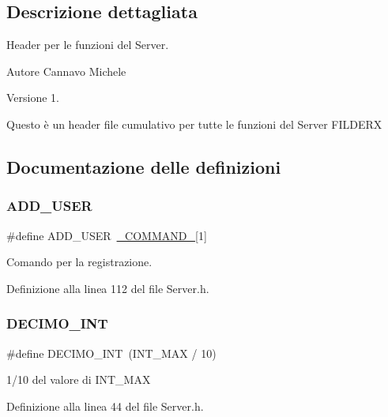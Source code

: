 \subsection{Descrizione dettagliata}
Header per le funzioni del Server. 



 \begin{DoxyAuthor}{Autore}
Cannavo Michele
\end{DoxyAuthor}
\begin{DoxyVersion}{Versione}
1.
\end{DoxyVersion}
Questo è un header file cumulativo per tutte le funzioni del Server F\+I\+L\+D\+E\+RX 

\subsection{Documentazione delle definizioni}
\mbox{\label{a00050_a8b1058dc115af8d4db0d84f2c43a61ca}} 
\subsubsection{\texorpdfstring{ADD\_USER}{ADD\_USER}}
{\footnotesize\ttfamily \#define A\+D\+D\+\_\+\+U\+S\+ER~\mbox{\hyperlink{a00050_ad7ed85b86ff98d7a5853304284acd79e}{\+\_\+\+C\+O\+M\+M\+A\+N\+D\+\_\+}}\mbox{[}1\mbox{]}}



Comando per la registrazione. 



Definizione alla linea 112 del file Server.\+h.

\mbox{\label{a00050_a3ac31ce35ba8dcc4af19c8045ef22e41}} 
\subsubsection{\texorpdfstring{DECIMO\_INT}{DECIMO\_INT}}
{\footnotesize\ttfamily \#define D\+E\+C\+I\+M\+O\+\_\+\+I\+NT~(I\+N\+T\+\_\+\+M\+AX / 10)}



1/10 del valore di I\+N\+T\+\_\+\+M\+AX 



Definizione alla linea 44 del file Server.\+h.


